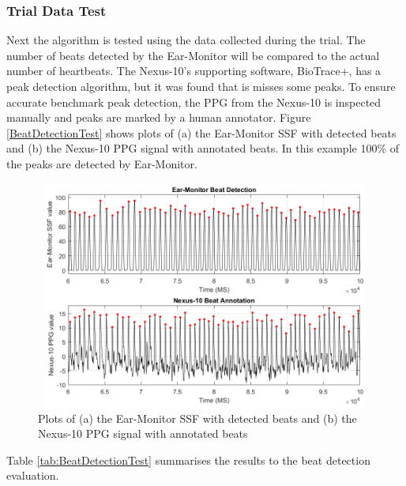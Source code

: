 \subsubsection{Trial Data Test}
Next the algorithm is tested using the data collected during the trial. The number of beats detected by the Ear-Monitor will be compared to the actual number of heartbeats. The Nexus-10's supporting software, BioTrace+, has a peak detection algorithm, but it was found that is misses some peaks. To ensure accurate benchmark peak detection, the PPG from the Nexus-10 is inspected manually and peaks are marked by a human annotator. Figure \ref{BeatDetectionTest} shows plots of (a) the Ear-Monitor SSF with detected beats and (b) the Nexus-10 PPG signal with annotated beats. In this example 100\% of the peaks are detected by Ear-Monitor.

\begin{figure}[H]
   \centering
   \includegraphics[width=12cm,height=7.5cm]{figs/BeatDetectionTest.png}
   \caption{Plots of (a) the Ear-Monitor SSF with detected beats and (b) the Nexus-10 PPG signal with annotated beats} %
   \label{fig:BeatDetectionTest}
\end{figure}

Table \ref{tab:BeatDetectionTest} summarises the results to the beat detection evaluation.

